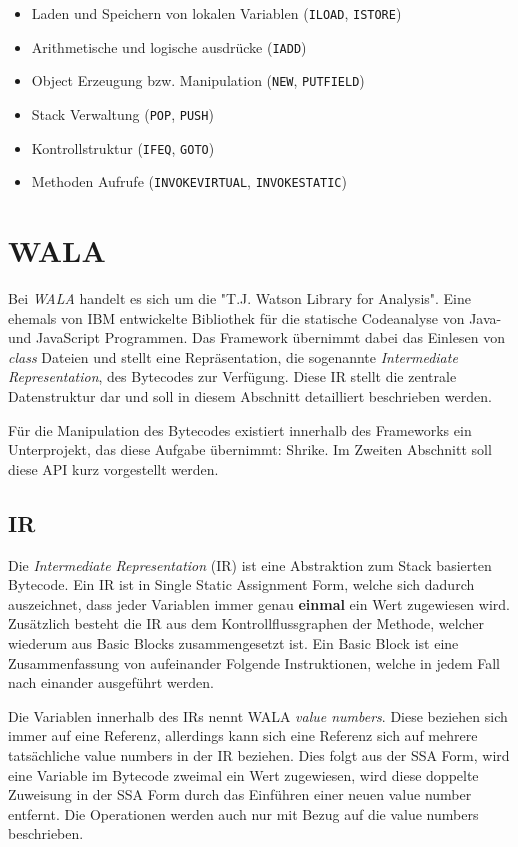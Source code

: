 \begin{itemize}
	\item Laden und Speichern von lokalen Variablen (\texttt{ILOAD}, \texttt{ISTORE})
	\item Arithmetische und logische ausdrücke (\texttt{IADD})
	\item Object Erzeugung bzw. Manipulation (\texttt{NEW}, \texttt{PUTFIELD})
	\item Stack Verwaltung (\texttt{POP}, \texttt{PUSH}) 
	\item Kontrollstruktur (\texttt{IFEQ}, \texttt{GOTO})
	\item Methoden Aufrufe (\texttt{INVOKEVIRTUAL}, \texttt{INVOKESTATIC})
\end{itemize}  


\section{WALA}

Bei \textit{WALA} handelt es sich um die "T.J. Watson Library for Analysis". Eine ehemals von IBM 
entwickelte Bibliothek für die statische Codeanalyse von Java- und JavaScript Programmen. Das Framework 
übernimmt dabei das Einlesen von \textit{class} Dateien und stellt eine Repräsentation, die sogenannte 
\textit{Intermediate Representation}, des Bytecodes zur Verfügung. Diese IR stellt die zentrale 
Datenstruktur dar und soll in diesem Abschnitt detailliert beschrieben werden.

Für die Manipulation des Bytecodes existiert innerhalb des Frameworks ein Unterprojekt, das diese Aufgabe 
übernimmt: Shrike. Im Zweiten Abschnitt soll diese API kurz vorgestellt werden.  

\subsection{IR}

Die \textit{Intermediate Representation} (IR) ist eine Abstraktion zum Stack basierten Bytecode. Ein IR ist
in Single Static Assignment Form, welche sich dadurch auszeichnet, dass jeder Variablen immer genau 
\textbf{einmal} ein Wert zugewiesen wird. Zusätzlich besteht die IR aus dem Kontrollflussgraphen der 
Methode, welcher wiederum aus Basic Blocks zusammengesetzt ist. Ein Basic Block ist eine Zusammenfassung 
von aufeinander Folgende Instruktionen, welche in jedem Fall nach einander ausgeführt werden.

Die Variablen innerhalb des IRs nennt WALA \textit{value numbers}. Diese beziehen sich immer auf eine 
Referenz, allerdings kann sich eine Referenz sich auf mehrere tatsächliche value numbers in der IR beziehen.
Dies folgt aus der SSA Form, wird eine Variable im Bytecode zweimal ein Wert zugewiesen, wird diese 
doppelte Zuweisung in der SSA Form durch das Einführen einer neuen value number entfernt. Die Operationen
werden auch nur mit Bezug auf die value numbers beschrieben.   
 
